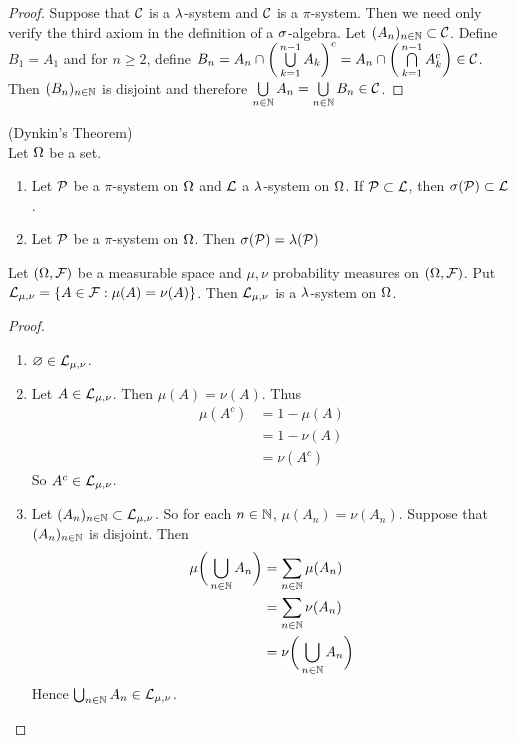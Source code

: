 \documentclass{book}
\begin{document}
	\begin{proof}
		Suppose that $\mathcal{C}$ is a $\lambda$-system and $\mathcal{C}$ is a $\pi$-system. Then we need only verify the third axiom in the definition of a $\sigma$-algebra. Let $(A_n)_{n \in \mathbb{N}} \subset \mathcal{C}$. Define $B_1 = A_1$ and for $n \geq 2$, define $B_n = A_n \cap \bigg( \bigcup\limits_{k=1}^{n-1}A_k \bigg)^c = A_n \cap \bigg( \bigcap\limits_{k=1}^{n-1}A_k^c \bigg) \in \mathcal{C}$. Then $(B_n)_{n \in \mathbb{N}}$ is disjoint and therefore $\bigcup\limits_{n \in \mathbb{N}}A_n = \bigcup\limits_{n \in \mathbb{N}}B_n \in \mathcal{C}$.
	\end{proof}
	
	\begin{thm}(Dynkin's Theorem) \\
		Let $\Omega$ be a set.
		\begin{enumerate}
			\item Let $\mathcal{P}$ be a $\pi$-system on $\Omega$ and $\mathcal{L}$ a $\lambda$-system on $\Omega$. If $\mathcal{P} \subset \mathcal{L}$, then $\sigma(\mathcal{P}) \subset \mathcal{L}$.
			\item Let $\mathcal{P}$ be a $\pi$-system on $\Omega$. Then $\sigma(\mathcal{P}) = \lambda(\mathcal{P})$
		\end{enumerate} 
		
	\end{thm}
	
	\begin{ex}
		Let $(\Omega, \mathcal{F})$ be a measurable space and $\mu, \nu$ probability measures on $(\Omega, \mathcal{F})$. Put $\mathcal{L}_{\mu,\nu} = \{A \in \mathcal{F}: \mu(A) = \nu(A)\}$. Then $\mathcal{L}_{\mu, \nu}$ is a $\lambda$-system on $\Omega$.
	\end{ex}
	
	\begin{proof}\
		\begin{enumerate}
			\item $\varnothing \in \mathcal{L}_{\mu, \nu}$.
			\item Let $A \in \mathcal{L}_{\mu, \nu}$. Then $\mu(A) = \nu(A)$. Thus 
			\begin{align*}
				\mu(A^c) 
				&= 1-\mu(A) \\
				&= 1 -\nu(A) \\
				&= \nu(A^c)
			\end{align*}
			So $A^c \in \mathcal{L}_{\mu, \nu}$. 
			\item Let $(A_n)_{n \in \mathbb{N}} \subset \mathcal{L}_{\mu, \nu}$. So for each $n \in \mathbb{N}$, $\mu(A_n) = \nu(A_n)$.  Suppose that $(A_n)_{n \in \mathbb{N}}$ is disjoint. Then 
			\begin{align*}
				\mu\bigg(\bigcup_{n \in \mathbb{N}} A_n\bigg) 
				&= \sum_{n \in \mathbb{N}} \mu(A_n) \\
				&= \sum_{n \in \mathbb{N}} \nu(A_n) \\
				&= \nu\bigg(\bigcup_{n \in \mathbb{N}} A_n\bigg) 
			\end{align*}
			Hence $\bigcup_{n \in \mathbb{N}} A_n \in \mathcal{L}_{\mu, \nu}$.
		\end{enumerate}
	\end{proof}
	
\end{document}
